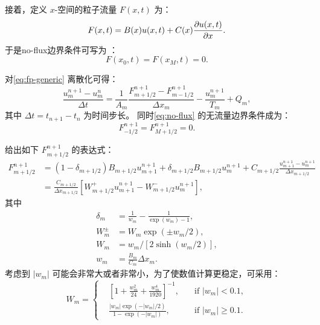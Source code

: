 接着，定义 $x$-空间的粒子流量 $F(x,t)$ 为：
\begin{equation}
  \label{eq:fp-f}
  F(x,t) = B(x) u(x,t) + C(x) \frac{\partial u(x,t)}{\partial x} .
\end{equation}
于是\ac{no-flux}边界条件可写为 \cite{park1995}：
\begin{equation}
  \label{eq:no-flux}
  F(x_0, t) = F(x_M, t) = 0 .
\end{equation}

对\autoref{eq:fp-generic} 离散化可得：
\begin{equation}
  \label{eq:fp-disc}
  \frac{u_m^{n+1} - u_m^n}{\Delta t}
    = \frac{1}{A_m} \frac{F_{m+1/2}^{n+1} - F_{m-1/2}^{n+1}}{\Delta x_m}
      - \frac{u_m^{n+1}}{T_m} + Q_m ,
\end{equation}
其中 $\Delta t = t_{n+1} - t_n$ 为时间步长。
同时\autoref{eq:no-flux} 的无流量边界条件成为：
\begin{equation}
  \label{eq:no-flux-disc}
  F_{-1/2}^{n+1} = F_{M+1/2}^{n+1} = 0 .
\end{equation}

 给出如下 $F_{m+1/2}^{n+1}$ 的表达式：
\begin{align}
  \label{eq:fp-f-chang70}
  F_{m+1/2}^{n+1} & = (1 - \delta_{m+1/2}) B_{m+1/2} u_{m+1}^{n+1}
      + \delta_{m+1/2} B_{m+1/2} u_m^{n+1}
      + C_{m+1/2} \frac{u_{m+1}^{n+1} - u_m^{n+1}}{\Delta x_{m+1/2}} \\
    & = \frac{C_{m+1/2}}{\Delta x_{m+1/2}} \left[
      W_{m+1/2}^{+} u_{m+1}^{n+1} - W_{m+1/2}^{-} u_m^{n+1} \right] ,
\end{align}
其中
\begin{align}
  \delta_m & = \frac{1}{w_m} - \frac{1}{\exp(w_m) - 1} ,
    \label{eq:fp-delta-m} \\
  W_m^{\pm} & = W_m \exp(\pm w_m / 2) ,
    \label{eq:fp-Wm-pm} \\
  W_m & = w_m \big/ [2 \sinh(w_m / 2)] ,
    \label{eq:fp-Wm} \\
  w_m & = \frac{B_m}{C_m} \Delta x_m .
    \label{eq:fp-wm}
\end{align}
考虑到 $|w_m|$ 可能会非常大或者非常小，为了使数值计算更稳定，可采用\cite{park1996}：
\begin{equation}
  \label{eq:fp-Wm-calc}
  W_m = \left\{
    \begin{alignedat}{2}
      & \left[ 1 + \frac{w_m^2}{24} + \frac{w_m^4}{1920} \right]^{-1} ,
        & \quad\text{if~} |w_m| < 0.1 , \\
      & \frac{|w_m| \exp(-|w_m|/2)}{1 - \exp(-|w_m|)} ,
        & \quad\text{if~} |w_m| \ge 0.1 .
    \end{alignedat}
  \right.
\end{equation}

